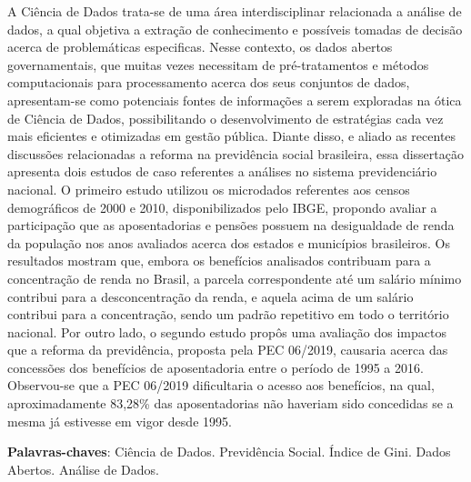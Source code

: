 
\setlength{\absparsep}{18pt} %
\begin{resumo}
A Ciência de Dados trata-se de uma área interdisciplinar relacionada a análise de dados, a qual objetiva a extração de conhecimento e possíveis tomadas de decisão acerca de problemáticas especificas. Nesse contexto, os dados abertos governamentais, que muitas vezes necessitam de pré-tratamentos e métodos computacionais para processamento acerca dos seus conjuntos de dados, apresentam-se como potenciais fontes de informações a serem exploradas na ótica de Ciência de Dados, possibilitando o desenvolvimento de estratégias cada vez mais eficientes e otimizadas em gestão pública. Diante disso, e aliado as recentes discussões relacionadas a reforma na previdência social brasileira, essa dissertação apresenta dois estudos de caso referentes a análises no sistema previdenciário nacional. O primeiro estudo utilizou os microdados referentes aos censos demográficos de 2000 e 2010, disponibilizados pelo IBGE, propondo avaliar a participação que as aposentadorias e pensões possuem na desigualdade de renda da população nos anos avaliados acerca dos estados e municípios brasileiros. Os resultados mostram que, embora os benefícios analisados contribuam para a concentração de renda no Brasil, a parcela correspondente até um salário mínimo contribui para a desconcentração da renda, e aquela acima de um salário contribui para a concentração, sendo um padrão repetitivo em todo o território nacional. Por outro lado, o segundo estudo propôs uma avaliação dos impactos que a reforma da previdência, proposta pela PEC 06/2019, causaria acerca das concessões dos benefícios de aposentadoria entre o período de 1995 a 2016. Observou-se que a PEC 06/2019 dificultaria o acesso aos benefícios, na qual, aproximadamente 83,28\% das aposentadorias não haveriam sido concedidas se a mesma já estivesse em vigor desde 1995.

\textbf{Palavras-chaves}: Ciência de Dados. Previdência Social. Índice de Gini. Dados Abertos. Análise de Dados.
\end{resumo}

